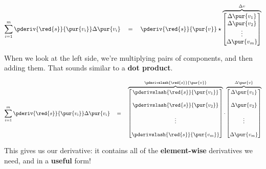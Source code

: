         \begin{equation}
            \sum_{i=1}^{m}
            \pderiv{\red{s}}   {\pur{v_i}}
            \Delta \pur{v_i}
            \quad
            =
            \quad
            \pderiv{\red{s}}{ \pur{v} } 
            \star
            \overbrace{
                \begin{bmatrix}
                    \Delta \pur{v_1}\\ \Delta \pur{v_2}\\ \vdots \\ \Delta \pur{v_m}
                \end{bmatrix}
            }^{\Delta v}
        \end{equation}
        
        When we look at the left side, we're multiplying pairs of components, and then adding them. That sounds similar to a \textbf{dot product}.
        
        \begin{equation}
            \sum_{i=1}^{m}
            \pderiv{\red{s}}   {\pur{v_i}}
            \Delta \pur{v_i}
            \quad
            =
            \quad
            \overbrace{
                \begin{bmatrix}
                    \pderivslash{\red{s}}   {\pur{v_1}}\\ 
                    \\
                    \pderivslash{\red{s}}   {\pur{v_2}}\\ 
                    \\
                    \vdots \\ 
                    \\
                    \pderivslash{\red{s}}   {\pur{v_m}}
                \end{bmatrix}
            }^{\pderivslash{\red{s}}{ \pur{v} }}
            \cdot
            \overbrace{
                \begin{bmatrix}
                    \Delta \pur{v_1}\\\\ \Delta \pur{v_2}\\\\ \vdots \\\\ \Delta \pur{v_m}
                \end{bmatrix}
            }^{\Delta \pur{v} }
        \end{equation}
        
        This gives us our derivative: it contains all of the \textbf{element-wise} derivatives we need, and in a \textbf{useful} form!\\
        
